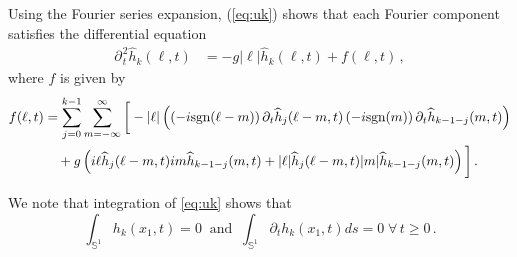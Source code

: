 \documentclass[11pt]{article}
\theoremstyle{plain}
\theoremstyle{definition}
\theoremstyle{definition}
\def\p{\text{\bf\emph{p}}}
\def\ft #1{{\widehat{#1}}}
\def\p{{\partial\hspace{1pt}}}
\begin{document}
Using the Fourier series expansion,
 (\ref{eq:uk}) shows that each Fourier component satisfies the differential equation
\begin{align}\label{eq:hmodelfourier}
\p_{\!t}^2 \ft{h}_k(\ell,t) &= -g |\ell| \ft{h}_k(\ell,t) +f(\ell,t) \,,
\end{align}
where $f$ is given by
\begin{align}
f(\ell,t) &= \sum_{j=0}^{k-1}\sum_{m=-\infty}^{\infty}\bigg{[}-|\ell|\left(\left(-i\text{sgn}(\ell-m)\right)\p_{\!t}\ft{h}_{j}(\ell-m,t)\left(-i\text{sgn}(m)\right)\p_{\!t}\ft{h}_{k-1-j}(m,t)\right)\nonumber\\
&\quad+g\left( i\ell\ft{h}_{j}(\ell-m,t)im \ft{h}_{k-1-j}(m,t) +
|\ell|\ft{h}_{j}(\ell-m,t)|m|\ft{h}_{k-1-j}(m,t) \right) \bigg{]}\,.\label{forcingwave}
\end{align}

We note that  integration of \eqref{eq:uk} shows that
\begin{equation}\label{zero_average}
\int_{\mathbb{S}^1} h_k(x_1,t)=0 \ \text{ and } \ \int_{\mathbb{S}^1} \partial_th_k(x_1,t)ds=0\;\forall\,t\geq0\,.
\end{equation}

\end{document}

